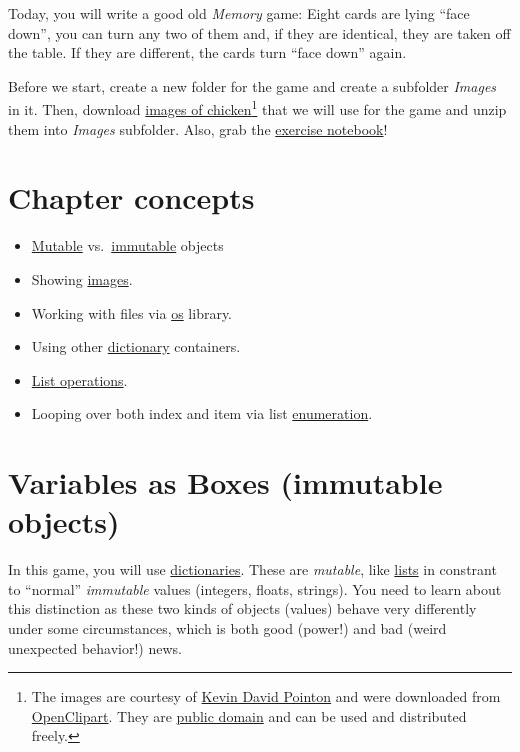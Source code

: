 \documentclass[
]{book}
\providecommand{\tightlist}{%
  \setlength{\itemsep}{0pt}\setlength{\parskip}{0pt}}
\begin{document}
Today, you will write a good old \emph{Memory} game: Eight cards are lying ``face down'', you can turn any two of them and, if they are identical, they are taken off the table. If they are different, the cards turn ``face down'' again.

Before we start, create a new folder for the game and create a subfolder \emph{Images} in it. Then, download \href{material/chicken.zip}{images of chicken}\footnote{The images are courtesy of \href{https://openclipart.org/artist/Firkin}{Kevin David Pointon} and were downloaded
  from \href{https://openclipart.org/}{OpenClipart}. They are \href{https://creativecommons.org/publicdomain/zero/1.0/}{public domain} and can be used and distributed freely.} that we will use for the game and unzip them into \emph{Images} subfolder. Also, grab the \href{notebooks/08.\%20Memory\%20game.ipynb}{exercise notebook}!

\hypertarget{chapter-concepts-5}{%
\section{Chapter concepts}\label{chapter-concepts-5}}

\begin{itemize}
\tightlist
\item
  \protect\hyperlink{mutable-objects}{Mutable} vs.~\protect\hyperlink{variables-as-boxes-immutable-objects}{immutable} objects
\item
  Showing \protect\hyperlink{imagestim}{images}.
\item
  Working with files via \protect\hyperlink{os-library}{os} library.
\item
  Using other \protect\hyperlink{dictionaries}{dictionary} containers.
\item
  \protect\hyperlink{list-operations}{List operations}.
\item
  Looping over both index and item via list \protect\hyperlink{enumerate}{enumeration}.
\end{itemize}

\hypertarget{variables-as-boxes-immutable-objects}{%
\section{Variables as Boxes (immutable objects)}\label{variables-as-boxes-immutable-objects}}

In this game, you will use \protect\hyperlink{dictionaries}{dictionaries}. These are \emph{mutable}, like \protect\hyperlink{lists}{lists} in constrant to ``normal'' \emph{immutable} values (integers, floats, strings). You need to learn about this distinction as these two kinds of objects (values) behave very differently under some circumstances, which is both good (power!) and bad (weird unexpected behavior!) news.
\end{document}

